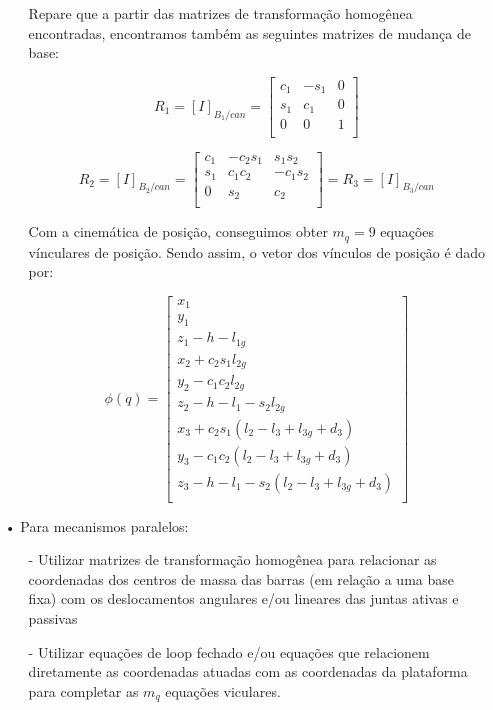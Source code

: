 \documentclass[12pt,a4paper]{article}
\begin{document}
\begin{itemize}
\begin{itemize}
Repare que a partir das matrizes de transformação homogênea encontradas, encontramos também as seguintes matrizes de mudança de base:

$$ R_1 = [I]_{B_1/can} =  \begin{bmatrix}
 c_1 & -s_1 & 0 \\
 s_1 & c_1 & 0 \\
 0 & 0 & 1 \\
\end{bmatrix} $$

$$ R_2 = [I]_{B_2/can} =  \begin{bmatrix}
 c_1 & -c_2 s_1 & s_1 s_2 \\
 s_1 & c_1 c_2 & -c_1 s_2 \\
 0 & s_2 & c_2 \\
\end{bmatrix}
= R_3 = [I]_{B_3/can} $$

Com a cinemática de posição, conseguimos obter $m_q = 9$ equações vínculares de posição. Sendo assim, o vetor dos vínculos de posição é dado por:

$$
\phi(q)
=
\begin{bmatrix}
x_1  \\
y_1 \\
z_1 - h - l_{1g} \\
x_2 + c_2 s_1 l_{2g} \\
y_2 - c_1 c_2 l_{2g}\\
z_2 -h - l_1 - s_2 l_{2g}\\
x_3 + c_2 s_1 (l_2-l_3+l_{3g}+d_3) \\
y_3 - c_1 c_2 (l_2-l_3+l_{3g}+d_3) \\
z_3 - h - l_1 - s_2 (l_2-l_3+l_{3g}+d_3)\\
\end{bmatrix}
$$

\end{itemize}

\item[•] Para mecanismos paralelos:
	\begin{itemize}
	
	\item[-] Utilizar matrizes de transformação homogênea para relacionar as coordenadas dos centros de massa das barras (em relação a uma 		base fixa) com os deslocamentos angulares e/ou lineares das juntas ativas e passivas
	\item[-] Utilizar equações de loop fechado e/ou equações que relacionem diretamente as coordenadas atuadas com as coordenadas da 				plataforma para completar as $m_q$ equações viculares.


\end{itemize}
\end{itemize}
\end{document}
